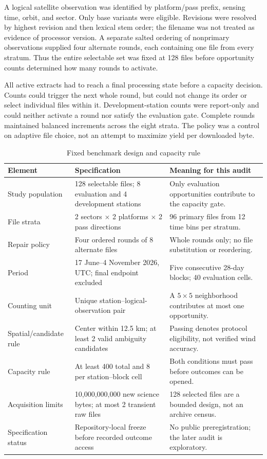 A logical satellite observation was identified by platform/pass prefix, sensing time, orbit, and sector. Only base variants were eligible. Revisions were resolved by highest revision and then lexical stem order; the filename was not treated as evidence of processor version. A separate salted ordering of nonprimary observations supplied four alternate rounds, each containing one file from every stratum. Thus the entire selectable set was fixed at 128 files before opportunity counts determined how many rounds to activate.

All active extracts had to reach a final processing state before a capacity decision. Counts could trigger the next whole round, but could not change its order or select individual files within it. Development-station counts were report-only and could neither activate a round nor satisfy the evaluation gate. Complete rounds maintained balanced increments across the eight strata. The policy was a control on adaptive file choice, not an attempt to maximize yield per downloaded byte.

\begin{table}[!t]
\caption{Fixed benchmark design and capacity rule}
\label{tab:design}
\centering\small
\begin{tabularx}{\textwidth}{@{}p{}Y Y@{}}
\toprule
Element & Specification & Meaning for this audit \\
\midrule
Study population & 128 selectable files; 8 evaluation and 4 development stations & Only evaluation opportunities contribute to the capacity gate. \\
File strata & 2 sectors $\times$ 2 platforms $\times$ 2 pass directions & 96 primary files from 12 time bins per stratum. \\
Repair policy & Four ordered rounds of 8 alternate files & Whole rounds only; no file substitution or reordering. \\
Period & 17 June--4 November 2026, UTC; final endpoint excluded & Five consecutive 28-day blocks; 40 evaluation cells. \\
Counting unit & Unique station--logical-observation pair & A $5\times5$ neighborhood contributes at most one opportunity. \\
Spatial/candidate rule & Center within 12.5 km; at least 2 valid ambiguity candidates & Passing denotes protocol eligibility, not verified wind accuracy. \\
Capacity rule & At least 400 total and 8 per station--block cell & Both conditions must pass before outcomes can be opened. \\
Acquisition limits & 10,000,000,000 new science bytes; at most 2 transient raw files & 128 selected files are a bounded design, not an archive census. \\
Specification status & Repository-local freeze before recorded outcome access & No public preregistration; the later audit is exploratory. \\
\bottomrule
\end{tabularx}
\end{table}

